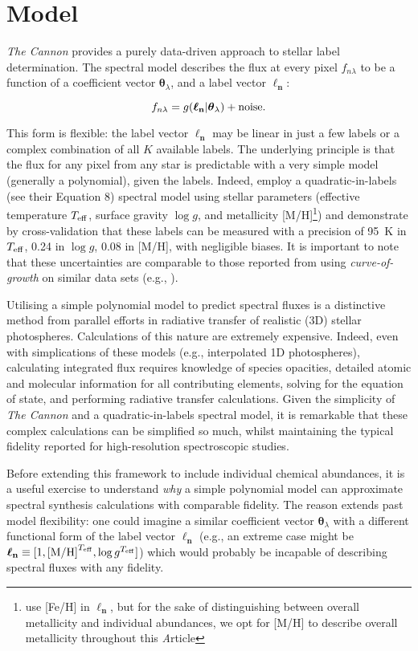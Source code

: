 \documentclass[useAMS,usenatbib]{mn2e}
\newcommand\article{\textit Article}
\newcommand\tc{\textit{The Cannon}}
\newcommand\lv{\mathbf{\boldsymbol\ell_n}}
\newcommand\cv{{\boldsymbol\theta}_\lambda}
\newcommand\given{|}
\begin{document}
\section{Model}


\tc{} provides a purely data-driven approach to stellar label determination. The
spectral model describes the flux at every pixel $f_{n\lambda}$ to be a function
of a coefficient vector $\cv$, and a label vector $\lv$:

\begin{equation}
    f_{n\lambda} = g(\lv\given\cv) + {\rm noise}.
\end{equation}

This form is flexible: the label vector $\lv$ may be linear in just a few labels
or a complex combination of all $K$ available labels. The underlying principle
is that the flux for any pixel from any star is predictable with a very simple
model (generally a polynomial), given the labels. Indeed, \citet{Ness2015}
employ a quadratic-in-labels (see their Equation 8) spectral model using stellar
parameters (effective temperature $T_{\rm eff}$, surface gravity $\log{g}$, and 
metallicity [M/H]\footnote{\citet{Ness2015} use [Fe/H] in $\lv$, but for the 
sake of distinguishing between overall metallicity and individual abundances,
we opt for [M/H] to describe overall metallicity throughout this \article{}})
and demonstrate by cross-validation that these labels can be 
measured with a precision of 95~K in $T_{\rm eff}$, 0.24 in $\log{g}$, 0.08 in 
[M/H], with negligible biases. It is important to note that these uncertainties
are comparable to those reported from using \textit{curve-of-growth} on similar 
data sets (e.g., \citet{X,Y}).  


Utilising a simple polynomial model to predict spectral fluxes is a distinctive
method from parallel efforts in radiative transfer of realistic (3D) stellar 
photospheres. Calculations of this nature are extremely expensive. Indeed, even
with simplications of these models (e.g., interpolated 1D photospheres),
calculating integrated flux requires knowledge of species opacities, detailed 
atomic and molecular information for all contributing elements, solving for
the equation of state, and performing radiative transfer calculations. Given the
simplicity of \tc{} and a quadratic-in-labels spectral model, it is remarkable
that these complex calculations can be simplified so much, whilst maintaining
the typical fidelity reported for high-resolution spectroscopic studies.

Before extending this framework to include individual chemical abundances, it is
a useful exercise to understand \textit{why} a simple polynomial model can 
approximate spectral synthesis calculations with comparable fidelity. The reason
extends past model flexibility: one could imagine a similar coefficient vector
$\cv$ with a different functional form of the label vector $\lv$ (e.g., an
extreme case might be $\lv \equiv [1, {\rm [M/H]}^{T_{\rm eff}},
\log{g}^{T_{\rm eff}}]$) which would probably be incapable of describing
spectral fluxes with any fidelity.
\end{document}
